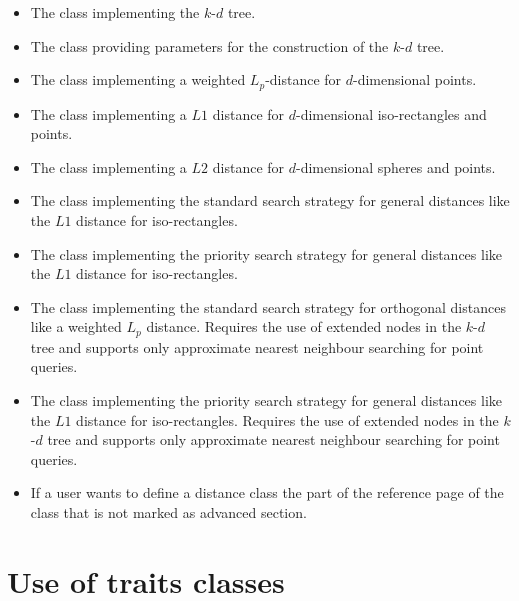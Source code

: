\begin{itemize}

\item
The class  implementing the $k$-$d$ tree.

\item
The class  providing parameters for the construction of the $k$-$d$ tree.

\item
The class  implementing a weighted $L_p$-distance for $d$-dimensional points.

\item
The class  implementing a $L1$ distance for $d$-dimensional
iso-rectangles and points. 

\item
The class  implementing a $L2$ distance for $d$-dimensional
spheres and points. 

\item
The class  implementing the standard search strategy for general distances
like the $L1$ distance for iso-rectangles.

\item
The class  implementing the priority search strategy for general distances
like the $L1$ distance for iso-rectangles.

\item
The class  implementing the standard search strategy for orthogonal distances
like a weighted $L_p$ distance. Requires the use of extended nodes in the $k$-$d$ tree and supports
only approximate nearest neighbour searching for point queries.

\item
The class  implementing the priority search strategy for general distances
like the $L1$ distance for iso-rectangles. Requires the use of extended nodes in the $k$-$d$ tree
and supports
only approximate nearest neighbour searching for point queries.

\item
If a user wants to define a distance class the part of the reference page of the class
 that is not marked as advanced section.
 
\end{itemize}

\section{Use of traits classes}

